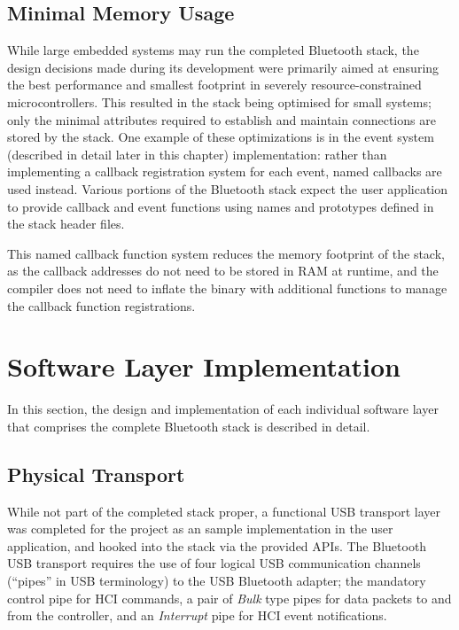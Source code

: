 \subsection{Minimal Memory Usage}

While large embedded systems may run the completed Bluetooth stack, the design decisions made during its development were primarily aimed at ensuring the best performance and smallest footprint in severely resource-constrained microcontrollers. This resulted in the stack being optimised for small systems; only the minimal attributes required to establish and maintain connections are stored by the stack. One example of these optimizations is in the event system (described in detail later in this chapter) implementation: rather than implementing a callback registration system for each event, named callbacks are used instead. Various portions of the Bluetooth stack expect the user application to provide callback and event functions using names and prototypes defined in the stack header files.

This named callback function system reduces the memory footprint of the stack, as the callback addresses do not need to be stored in RAM at runtime, and the compiler does not need to inflate the binary with additional functions to manage the callback function registrations.

\section{Software Layer Implementation}

In this section, the design and implementation of each individual software layer that comprises the complete Bluetooth stack is described in detail.

\subsection{Physical Transport}

While not part of the completed stack proper, a functional USB transport layer was completed for the project as an sample implementation in the user application, and hooked into the stack via the provided APIs. The Bluetooth USB transport \cite{bt2p1specs_usbtransport} requires the use of four logical USB communication channels (``pipes'' in USB terminology) to the USB Bluetooth adapter; the mandatory control pipe for HCI commands, a pair of \textit{Bulk} type pipes for data packets to and from the controller, and an \textit{Interrupt} pipe for HCI event notifications.

